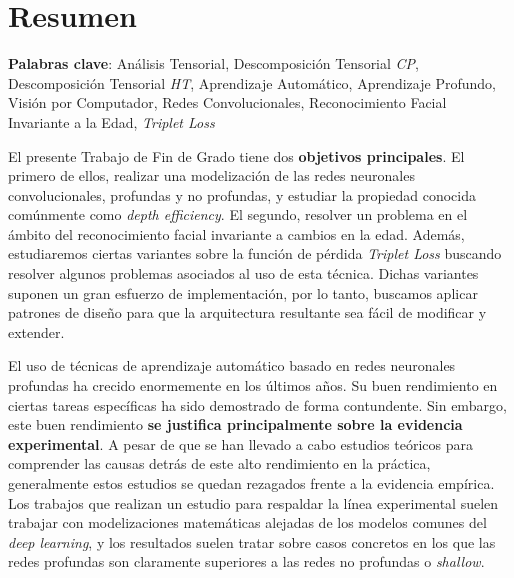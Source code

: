 %



\chapter{Resumen}

\textbf{Palabras clave}: Análisis Tensorial, Descomposición Tensorial \textit{CP}, Descomposición Tensorial \textit{HT}, Aprendizaje Automático, Aprendizaje Profundo, Visión por Computador, Redes Convolucionales, Reconocimiento Facial Invariante a la Edad, \textit{Triplet Loss}

El presente Trabajo de Fin de Grado tiene dos \textbf{objetivos principales}. El primero de ellos,  realizar una modelización de las redes neuronales convolucionales, profundas y no profundas, y estudiar la propiedad conocida comúnmente como \textit{depth efficiency}. El segundo, resolver un problema en el ámbito del reconocimiento facial invariante a cambios en la edad. Además, estudiaremos ciertas variantes sobre la función de pérdida \textit{Triplet Loss} buscando resolver algunos problemas asociados al uso de esta técnica. Dichas variantes suponen un gran esfuerzo de implementación, por lo tanto, buscamos aplicar patrones de diseño para que la arquitectura resultante sea fácil de modificar y extender.

El uso de técnicas de aprendizaje automático basado en redes neuronales profundas ha crecido enormemente en los últimos años. Su buen rendimiento en ciertas tareas específicas ha sido demostrado de forma contundente. Sin embargo, este buen rendimiento \textbf{se justifica principalmente sobre la evidencia experimental}. A pesar de que se han llevado a cabo estudios teóricos para comprender las causas detrás de este alto rendimiento en la práctica, generalmente estos estudios se quedan rezagados frente a la evidencia empírica. Los trabajos que realizan un estudio para respaldar la línea experimental suelen trabajar con modelizaciones matemáticas alejadas de los modelos comunes del \textit{deep learning}, y los resultados suelen tratar sobre casos concretos en los que las redes profundas son claramente superiores a las redes no profundas o \textit{shallow}.


